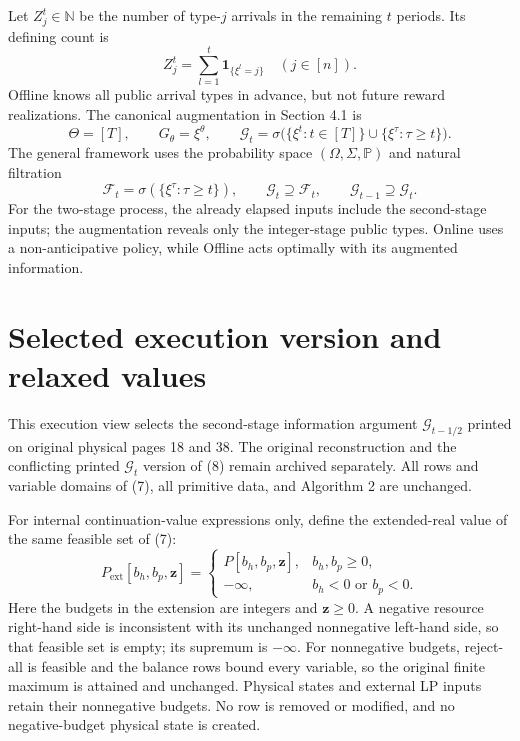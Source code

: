 \documentclass{article}
\begin{document}
Let $Z_j^t\in\mathbb N$ be the number of type-$j$ arrivals in the remaining $t$ periods. Its defining count is
\[
Z_j^t=\sum_{l=1}^{t}\mathbf1_{\{\xi^l=j\}}
\quad(j\in[n]).
\]
Offline knows all public arrival types in advance, but not future reward realizations. The canonical augmentation in Section 4.1 is
\[
\Theta=[T],\qquad G_\theta=\xi^\theta,
\qquad
\mathcal G_t=\sigma\bigl(\{\xi^t:t\in[T]\}\cup
\{\xi^\tau:\tau\ge t\}\bigr).
\]
The general framework uses the probability space $(\Omega,\Sigma,\mathbb P)$ and natural filtration
\[
\mathcal F_t=\sigma(\{\xi^\tau:\tau\ge t\}),
\qquad
\mathcal G_t\supseteq\mathcal F_t,
\qquad
\mathcal G_{t-1}\supseteq\mathcal G_t.
\]
For the two-stage process, the already elapsed inputs include the second-stage inputs; the augmentation reveals only the integer-stage public types. Online uses a non-anticipative policy, while Offline acts optimally with its augmented information.

\section*{Selected execution version and relaxed values}
This execution view selects the second-stage information argument $\mathcal G_{t-1/2}$ printed on original physical pages 18 and 38. The original reconstruction and the conflicting printed $\mathcal G_t$ version of (8) remain archived separately. All rows and variable domains of (7), all primitive data, and Algorithm 2 are unchanged.

For internal continuation-value expressions only, define the extended-real value of the same feasible set of (7):
\[
P_{\mathrm{ext}}[b_h,b_p,\mathbf z]=
\begin{cases}
P[b_h,b_p,\mathbf z],&b_h,b_p\ge0,\\
-\infty,&b_h<0\text{ or }b_p<0.
\end{cases}
\]
Here the budgets in the extension are integers and $\mathbf z\ge0$. A negative resource right-hand side is inconsistent with its unchanged nonnegative left-hand side, so that feasible set is empty; its supremum is $-\infty$. For nonnegative budgets, reject-all is feasible and the balance rows bound every variable, so the original finite maximum is attained and unchanged. Physical states and external LP inputs retain their nonnegative budgets. No row is removed or modified, and no negative-budget physical state is created.
\end{document}
